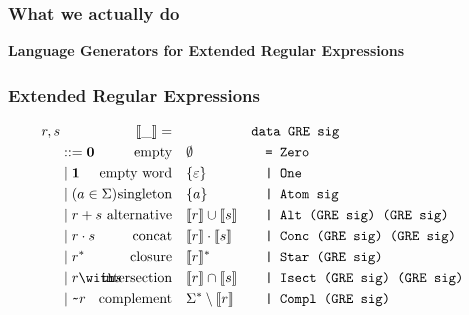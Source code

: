\documentclass[pdftex,aspectratio=169]{beamer}
\begin{document}
\begin{frame}
  \frametitle{What we actually do}
  \begin{Huge}
    \begin{center}
      \bf
      Language Generators for Extended Regular Expressions
    \end{center}
  \end{Huge}
\end{frame}
\begin{frame}
  \frametitle{Extended Regular Expressions}
  \vspace{-\baselineskip}
  \footnotesize
  \begin{align*}
    r, s & &\Lang{\_}=\quad &  &
                             \makebox[1em][l]{\code{data GRE sig}}\\
         & ::= \Rnull & \ltext{empty}
                        & \emptyset
                           &&\code{= Zero}\\
         & \mid \Rempty & \ltext{empty word}
                        & \{ \varepsilon \}
                           && \code{| One}\\
         & \mid (a \in \Sigma) & \ltext{singleton}
                        &  \{ a \}
                           && \code{| Atom sig} \\
         & \mid \Runion rs & \ltext{alternative}
                        &  \Lang{r} \cup \Lang{s}
                           && \code{| Alt (GRE sig) (GRE sig)}\\
         & \mid \Rconcat rs & \ltext{concat}
                        &  \Lang r \cdot \Lang s
                           && \code{| Conc (GRE sig) (GRE sig)}\\
         & \mid \Rstar r & \ltext{closure}
                        & \Lang r^* 
                           && \code{| Star (GRE sig)}\\
         & \mid \Rintersect rs & \ltext{intersection}
                        & \Lang r \cap \Lang s
                           && \code{| Isect (GRE sig) (GRE sig)}\\
         & \mid \Rcomplement r & \ltext{complement}
                        & \Sigma^* \setminus \Lang r
                           && \code{| Compl (GRE sig)}
  \end{align*}
\end{frame} 
\end{document}
